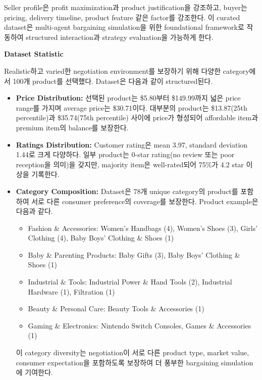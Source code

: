 Seller profile은 profit maximization과 product justification을 강조하고, buyer는 pricing, delivery timeline, product feature 같은 factor를 강조한다. 이 curated dataset은 multi-agent bargaining simulation을 위한 foundational framework로 작동하여 structured interaction과 strategy evaluation을 가능하게 한다.

\textbf{Dataset Statistic}

Realistic하고 varied한 negotiation environment를 보장하기 위해 다양한 category에서 100개 product를 선택했다. Dataset은 다음과 같이 structured된다.

\begin{itemize}
    \item \textbf{Price Distribution:}
    선택된 product는 \$5.80부터 \$149.99까지 넓은 price range를 가지며 average price는 \$30.71이다. 대부분의 product는 \$13.87(25th percentile)과 \$35.74(75th percentile) 사이에 price가 형성되어 affordable item과 premium item의 balance를 보장한다.

    \item \textbf{Ratings Distribution:}
    Customer rating은 mean 3.97, standard deviation 1.44로 크게 다양하다. 일부 product는 0-star rating(no review 또는 poor reception을 의미)을 갖지만, majority item은 well-rated되어 75\%가 4.2 star 이상을 기록한다.

    \item \textbf{Category Composition:}
    Dataset은 78개 unique category의 product를 포함하여 서로 다른 consumer preference의 coverage를 보장한다. Product example은 다음과 같다.

    \begin{itemize}
        \item Fashion \& Accessories: Women's Handbags (4), Women's Shoes (3), Girls' Clothing (4), Baby Boys' Clothing \& Shoes (1)
        \item Baby \& Parenting Products: Baby Gifts (3), Baby Boys' Clothing \& Shoes (1)
        \item Industrial \& Tools: Industrial Power \& Hand Tools (2), Industrial Hardware (1), Filtration (1)
        \item Beauty \& Personal Care: Beauty Tools \& Accessories (1)
        \item Gaming \& Electronics: Nintendo Switch Consoles, Games \& Accessories (1)
    \end{itemize}

이 category diversity는 negotiation이 서로 다른 product type, market value, consumer expectation을 포함하도록 보장하여 더 풍부한 bargaining simulation에 기여한다.


\end{itemize}
